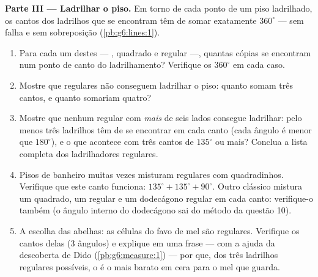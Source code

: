 \begin{problem}
\medskip
\noindent\textbf{Parte III --- Ladrilhar o piso.}
Em torno de cada ponto de um piso ladrilhado, os cantos dos ladrilhos
que se encontram têm de somar exatamente $360^\circ$ --- sem falha e
sem sobreposição (\cref{pb:g6:lines:1}).
\begin{enumerate}[resume]
  \item Para cada um destes --- , quadrado e
         regular ---, quantas cópias se encontram num ponto de
        canto do ladrilhamento? Verifique os $360^\circ$ em cada caso.
  \item Mostre que  regulares não conseguem ladrilhar o piso:
        quanto somam três cantos, e quanto somariam quatro?
  \item Mostre que nenhum  regular com \emph{mais} de seis
        lados consegue ladrilhar: pelo menos três ladrilhos têm de se
        encontrar em cada canto (cada ângulo é menor que $180^\circ$),
        e o que acontece com três cantos de $135^\circ$ ou mais?
        Conclua a lista completa dos ladrilhadores regulares.
  \item Pisos de banheiro muitas vezes misturam  regulares com
        quadradinhos. Verifique que este canto funciona:
        $135^\circ + 135^\circ + 90^\circ$. Outro clássico mistura um
        quadrado, um  regular e um dodecágono regular em cada
        canto: verifique-o também (o ângulo interno do dodecágono sai
        do método da questão 10).
  \item A escolha das abelhas: as células do favo de mel são 
        regulares. Verifique os cantos delas ($3$ ângulos) e explique
        em uma frase --- com a ajuda da descoberta de Dido
        (\cref{pb:g6:measure:1}) --- por que, dos três ladrilhos
        regulares possíveis, o  é o mais barato em cera para o
        mel que guarda.
\end{enumerate}
\end{problem}
